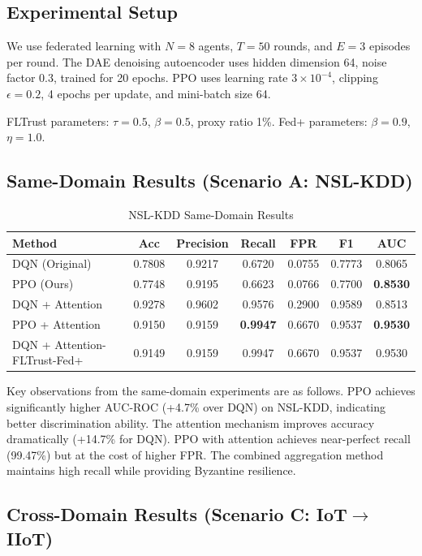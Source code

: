 \documentclass[conference]{IEEEtran}
\begin{document}
\subsection{Experimental Setup}

We use federated learning with $N=8$ agents, $T=50$ rounds, and $E=3$ episodes per round. The DAE denoising autoencoder uses hidden dimension 64, noise factor 0.3, trained for 20 epochs. PPO uses learning rate $3 \times 10^{-4}$, clipping $\epsilon=0.2$, 4 epochs per update, and mini-batch size 64.

FLTrust parameters: $\tau=0.5$, $\beta=0.5$, proxy ratio 1\%. Fed+ parameters: $\beta=0.9$, $\eta=1.0$.

\subsection{Same-Domain Results (Scenario A: NSL-KDD)}

\begin{table}[htbp]
\centering
\caption{NSL-KDD Same-Domain Results}
\begin{tabular}{lcccccc}
\toprule
\textbf{Method} & \textbf{Acc} & \textbf{Precision} & \textbf{Recall} & \textbf{FPR} & \textbf{F1} & \textbf{AUC} \\
\midrule
DQN (Original) & 0.7808 & 0.9217 & 0.6720 & 0.0755 & 0.7773 & 0.8065 \\
PPO (Ours) & 0.7748 & 0.9195 & 0.6623 & 0.0766 & 0.7700 & \textbf{0.8530} \\
\midrule
DQN + Attention & 0.9278 & 0.9602 & 0.9576 & 0.2900 & 0.9589 & 0.8513 \\
PPO + Attention & 0.9150 & 0.9159 & \textbf{0.9947} & 0.6670 & 0.9537 & \textbf{0.9530} \\
\midrule
DQN + Attention-FLTrust-Fed+ & 0.9149 & 0.9159 & 0.9947 & 0.6670 & 0.9537 & 0.9530 \\
\bottomrule
\end{tabular}
\end{table}

Key observations from the same-domain experiments are as follows. PPO achieves significantly higher AUC-ROC (+4.7\% over DQN) on NSL-KDD, indicating better discrimination ability. The attention mechanism improves accuracy dramatically (+14.7\% for DQN). PPO with attention achieves near-perfect recall (99.47\%) but at the cost of higher FPR. The combined aggregation method maintains high recall while providing Byzantine resilience.

\subsection{Cross-Domain Results (Scenario C: IoT$\rightarrow$IIoT)}
\end{document}
